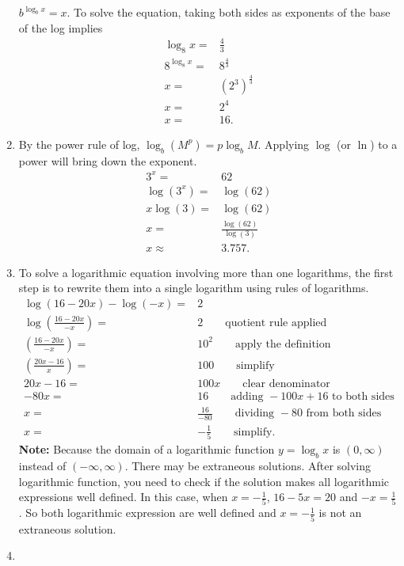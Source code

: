 \documentclass[
  12pt]{article}
\begin{document}
\begin{enumerate}
  \(b^{\log_bx}=x\). To solve the equation, taking both sides as
  exponents of the base of the log implies \[
  \begin{aligned}
  \log_8x=&\frac43\\
  8^{\log_8x}=&8^{\frac43}\\
  x=&(2^3)^{\frac43}\\
  x=&2^4\\
  x=&16.
  \end{aligned}
  \]
\item
  By the power rule of log, \(\log_b(M^p)=p\log_bM\). Applying \(\log\)
  (or \(\ln\)) to a power will bring down the exponent. \[
  \begin{aligned}
  3^x=&62\\
  \log(3^x)=&\log(62)\\
  x\log(3)=&\log(62)\\
  x=&\frac{\log(62)}{\log(3)}\\
  x\approx & 3.757.
  \end{aligned}
  \]
\item
  To solve a logarithmic equation involving more than one logarithms,
  the first step is to rewrite them into a single logarithm using rules
  of logarithms. \[
  \begin{aligned}
  \log(16-20x)-\log(-x)=&2\\
  \log\left(\frac{16-20x}{-x}\right)=&2\qquad \text{quotient rule applied}\\
  \left(\frac{16-20x}{-x}\right)=&10^2\qquad \text{apply the definition}\\
  \left(\frac{20x-16}{x}\right)=&100 \qquad \text{simplify}\\
  20x-16=&100x \qquad \text{clear denominator}\\
  -80x=&16 \qquad \text{adding } -100x+16 \text{ to both sides}\\
  x=&\frac{16}{-80} \qquad \text{dividing } -80 \text{ from both sides}\\
  x=&-\frac{1}{5} \qquad \text{simplify}.
  \end{aligned}
  \] \textbf{Note:} Because the domain of a logarithmic function
  \(y=\log_bx\) is \((0, \infty)\) instead of \((-\infty,\infty)\).
  There may be extraneous solutions. After solving logarithmic function,
  you need to check if the solution makes all logarithmic expressions
  well defined. In this case, when \(x=-\frac15\), \(16-5x=20\) and
  \(-x=\frac15\). So both logarithmic expression are well defined and
  \(x=-\frac15\) is not an extraneous solution.
\item

\end{enumerate}
\end{document}
